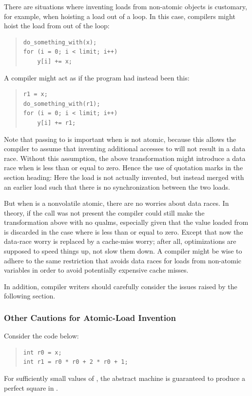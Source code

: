 \documentclass[10]{article}
\begin{document}
There are situations where inventing loads from non-atomic objects
is customary, for example, when hoisting a load out of a loop.
In this case, compilers might hoist the load from  out of
the loop:
\begin{quote}
\begin{verbatim}
do_something_with(x);
for (i = 0; i < limit; i++)
    y[i] += x;
\end{verbatim}
\end{quote}
A compiler might act as if the program had instead been this:
\begin{quote}
\begin{verbatim}
r1 = x;
do_something_with(r1);
for (i = 0; i < limit; i++)
    y[i] += r1;
\end{verbatim}
\end{quote}
Note that passing  to  is important
when  is not atomic,
because this allows the compiler to assume that inventing additional
accesses to  will not result in a data race.
Without this assumption, the above transformation might introduce a data
race when  is less than or equal to zero.
Hence the use of quotation marks in the section heading:
Here the load is not actually invented, but instead merged with an
earlier load such that there is no synchronization between the two loads.

But when  is a nonvolatile atomic, there are no worries about
data races.
In theory, if the  call was not present
the compiler could still make the transformation above with no
qualms, especially given that the value loaded from  is discarded in
the case where  is less than or equal to zero.
Except that now the data-race worry is replaced by a cache-miss worry;
after all, optimizations are supposed to speed things up,
not slow them down.
A compiler might be wise to adhere to the
same restriction that avoids data races for loads from non-atomic
variables in order to avoid potentially expensive cache misses.

In addition, compiler writers should carefully consider the issues
raised by the following section.

\subsubsection{Other Cautions for Atomic-Load Invention}
\label{app:Other Cautions for Atomic-Load Invention}

Consider the code below:
\begin{quote}
\begin{verbatim}
int r0 = x;
int r1 = r0 * r0 + 2 * r0 + 1;
\end{verbatim}
\end{quote}
For sufficiently small values of , the abstract machine is
guaranteed to produce a perfect square in .
\end{document}
